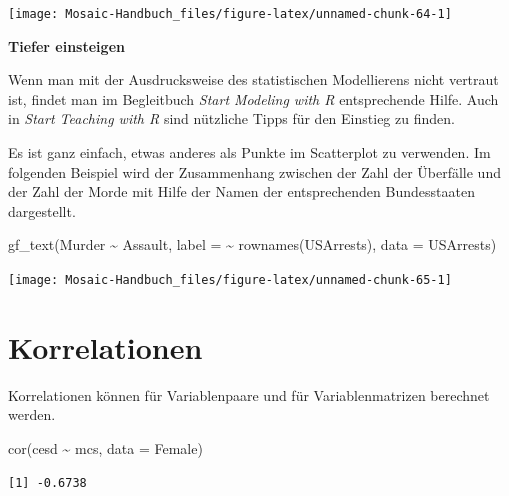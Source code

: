 \documentclass[
  ngerman,
]{scrbook}
\newenvironment{Shaded}{\begin{snugshade}}{\end{snugshade}}
\newcommand{\AttributeTok}[1]{\textcolor[rgb]{0.77,0.63,0.00}{#1}}
\newcommand{\FunctionTok}[1]{\textcolor[rgb]{0.00,0.00,0.00}{#1}}
\newcommand{\NormalTok}[1]{#1}
\newcommand{\SpecialCharTok}[1]{\textcolor[rgb]{0.00,0.00,0.00}{#1}}
\newenvironment{tiefereinsteigen}[1]
  {
  \begin{itemize}
  \renewcommand{\labelitemi}{
    \raisebox{2.6\height}[0pt][0pt]{
      {\setkeys{Gin}{width=7em,keepaspectratio}
        {\normalsize \textcolor{dark-fom-green}\faSearch}}
        }
  }
  \begin{blackbox}
         \bgroup\color{dark-fom-green}
          {\textbf{Tiefer einsteigen}}
        \egroup
  \item
  }
  {
  \end{blackbox}
  \end{itemize}
  }
\begin{document}
\begin{center}\texttt{[image: Mosaic-Handbuch\_files/figure-latex/unnamed-chunk-64-1]} \end{center}

\begin{tiefereinsteigen}{tiefereinsteigen}
Wenn man mit der Ausdrucksweise des statistischen Modellierens nicht vertraut ist, findet man im Begleitbuch \emph{Start Modeling with R} \autocite{TeachingR} entsprechende Hilfe.
Auch in \emph{Start Teaching with R} \autocite{ModelingR} sind nützliche Tipps für den Einstieg zu finden.

\end{tiefereinsteigen}

Es ist ganz einfach, etwas anderes als Punkte im Scatterplot zu verwenden. Im folgenden Beispiel wird der Zusammenhang zwischen der Zahl der Überfälle und der Zahl der Morde mit Hilfe der Namen der entsprechenden Bundesstaaten dargestellt.

\begin{Shaded}
\begin{Highlighting}[]
\FunctionTok{gf\_text}\NormalTok{(Murder }\SpecialCharTok{\textasciitilde{}}\NormalTok{ Assault, }
  \AttributeTok{label =} \SpecialCharTok{\textasciitilde{}} \FunctionTok{rownames}\NormalTok{(USArrests), }
  \AttributeTok{data =}\NormalTok{ USArrests)}
\end{Highlighting}
\end{Shaded}

\begin{center}\texttt{[image: Mosaic-Handbuch\_files/figure-latex/unnamed-chunk-65-1]} \end{center}

\hypertarget{korrelationen}{%
\section{Korrelationen}\label{korrelationen}}

Korrelationen können für Variablenpaare und für Variablenmatrizen berechnet werden.

\begin{Shaded}
\begin{Highlighting}[]
\FunctionTok{cor}\NormalTok{(cesd }\SpecialCharTok{\textasciitilde{}}\NormalTok{ mcs, }\AttributeTok{data =}\NormalTok{ Female)}
\end{Highlighting}
\end{Shaded}

\begin{verbatim}
[1] -0.6738
\end{verbatim}
\end{document}
